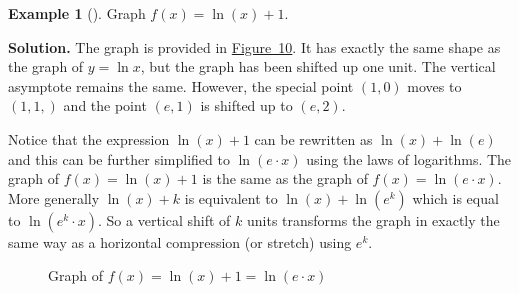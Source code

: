 \documentclass[10pt,]{book}
\theoremstyle{plain}
\theoremstyle{definition}
\theoremstyle{definition}
\newtheorem{example}[theorem]{Example}
\theoremstyle{definition}
\numberwithin{equation}{section}
\begin{document}
\begin{example}[]\label{example-26}
\hypertarget{p-348}{}%
Graph \(f(x) = \ln (x) +1 \).%
\par\smallskip%
\noindent\textbf{Solution.}\hypertarget{solution-26}{}\quad%
\hypertarget{p-349}{}%
The graph is provided in \hyperref[natural-log-plus-one]{Figure~10}. It has exactly the same shape as the graph of \(y = \ln x\), but the graph has been shifted up one unit. The vertical asymptote remains the same. However, the special point \(\left( 1,0 \right)\) moves to \(\left( 1,1, \right)\) and the point \(\left( e, 1 \right)\) is shifted up to \(\left( e, 2 \right)\).%
\par
\hypertarget{p-350}{}%
Notice that the expression \(\ln (x) + 1\) can be rewritten as \(\ln (x) + \ln (e)\) and this can be further simplified to \(\ln \left( e \cdot x \right)\) using the laws of logarithms. The graph of \(f(x) = \ln (x) + 1\) is the same as the graph of \(f(x) = \ln \left( e \cdot x \right)\).  More generally \(\ln (x) + k\) is equivalent to \(\ln (x) + \ln \left( e^k \right)\) which is equal to \(\ln \left( e^k \cdot x \right)\). So a vertical shift of \(k\) units transforms the graph in exactly the same way as a horizontal compression (or stretch) using \(e^k\).%
\begin{figure}
\centering
{
}
\caption{Graph of \(f(x) = \ln (x) +1 = \ln \left( e \cdot x \right)\)\label{natural-log-plus-one}}
\end{figure}
\end{example}
\end{document}
